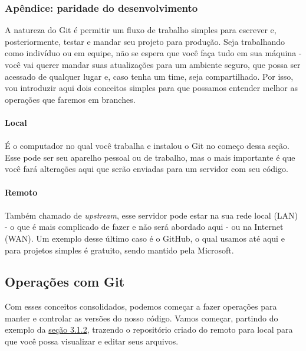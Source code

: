 \documentclass{article}
\begin{document}
  \subsubsection{Apêndice: paridade do desenvolvimento}

  A natureza do Git é permitir um fluxo de trabalho simples para escrever e, posteriormente, testar e mandar seu projeto para
  produção. Seja trabalhando como indivíduo ou em equipe, não se espera que você faça tudo em sua máquina - você vai querer
  mandar suas atualizações para um ambiente seguro, que possa ser acessado de qualquer lugar e, caso tenha um time, seja 
  compartilhado. Por isso, vou introduzir aqui dois conceitos simples para que possamos entender melhor as operações que 
  faremos em branches. 

  \paragraph{Local}
  \paragraph{}

  É o computador no qual você trabalha e instalou o Git no começo dessa seção. Esse pode ser seu aparelho pessoal ou 
  de trabalho, mas o mais importante é que você fará alterações aqui que serão enviadas para um servidor com seu código.

  \paragraph{Remoto}
  \paragraph{}

  Também chamado de \textit{upstream}, esse servidor pode estar na sua rede local (LAN) - o que é mais complicado de fazer e não será abordado aqui - ou na
  Internet (WAN). Um exemplo desse último caso é o GitHub, o qual usamos até aqui e para projetos simples é gratuito, sendo 
  mantido pela Microsoft. 

  \subsection{Operações com Git}

  Com esses conceitos consolidados, podemos começar a fazer operações para manter e controlar as versões do nosso código.
  Vamos começar, partindo do exemplo da \href{sec:branches}{seção 3.1.2}, trazendo o repositório criado do remoto para local para que você possa
  visualizar e editar seus arquivos. 
\end{document}
